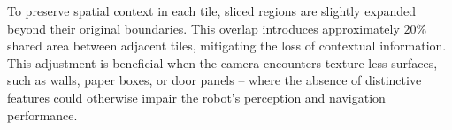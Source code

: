 To preserve spatial context in each tile, sliced regions are slightly expanded beyond their original boundaries. This overlap introduces approximately $20\%$ shared area between adjacent tiles, mitigating the loss of contextual information. This adjustment is beneficial when the camera encounters texture-less surfaces, such as walls, paper boxes, or door panels -- where the absence of distinctive features could otherwise impair the robot's perception and navigation performance.






